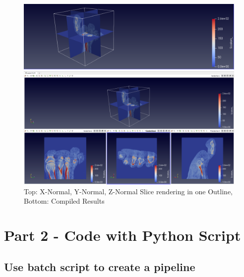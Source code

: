\documentclass[a4paper,11pt]{article}
\theoremstyle{mytheor}
\begin{document}
\begin{figure}[!h]
    \centering
    \includegraphics[scale = 0.6]{Q4_XYZ.PNG}
    
    \vspace{1 cm}
    \includegraphics[scale = 0.42]{Q4.PNG}
    
    \caption{Top: X-Normal, Y-Normal, Z-Normal Slice rendering in one Outline, Bottom: Compiled Results}
    \label{fig:q32}
\end{figure}

\clearpage

\section{Part 2 - Code with Python Script}
\subsection{Use batch script to create a pipeline}
\end{document}
